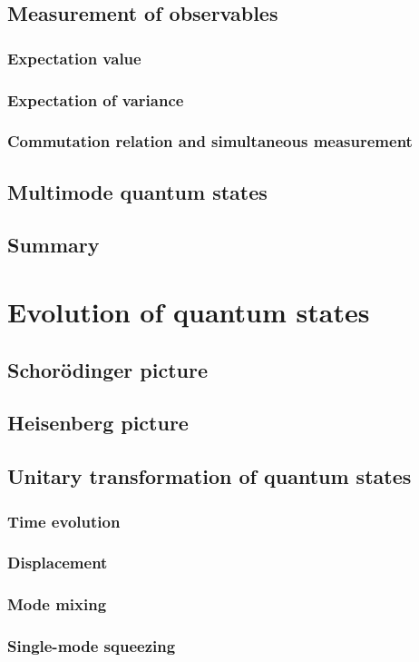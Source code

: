 \documentclass{book}
\begin{document}
\section{Measurement of observables}
\subsection{Expectation value}
\subsection{Expectation of variance}
\subsection{Commutation relation and simultaneous measurement}
\section{Multimode quantum states}
\section{Summary}

\chapter{Evolution of quantum states}
\section{Schor\"odinger picture}
\section{Heisenberg picture}
\section{Unitary transformation of quantum states}
\subsection{Time evolution}
\subsection{Displacement}
\subsection{Mode mixing}
\subsection{Single-mode squeezing}
\end{document}
